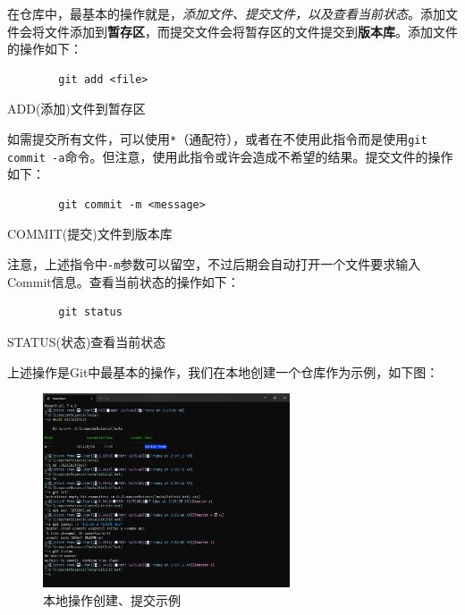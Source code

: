 在仓库中，最基本的操作就是，\textit{添加文件、提交文件，以及查看当前状态}。添加文件会将文件添加到\textbf{暂存区}，而提交文件会将暂存区的文件提交到\textbf{版本库}。添加文件的操作如下：

\begin{listing}[!htpb]
    \begin{verbatim}
        git add <file>
    \end{verbatim}
    \caption{ADD(添加)文件到暂存区}
\end{listing}

如需提交所有文件，可以使用\texttt{*}（通配符），或者在不使用此指令而是使用\texttt{git commit -a}命令。但注意，使用此指令或许会造成不希望的结果。提交文件的操作如下：

\begin{listing}[!htpb]
    \begin{verbatim}
        git commit -m <message>
    \end{verbatim}
    \caption{COMMIT(提交)文件到版本库}
\end{listing}

注意，上述指令中\texttt{-m}参数可以留空，不过后期会自动打开一个文件要求输入Commit信息。查看当前状态的操作如下：

\begin{listing}[!htpb]
    \begin{verbatim}
        git status
    \end{verbatim}
    \caption{STATUS(状态)查看当前状态}
\end{listing}

上述操作是Git中最基本的操作，我们在本地创建一个仓库作为示例，如下图：

\begin{figure}[!h]
    \centering
    \includegraphics[width=0.65\textwidth]{figures/git-local-operations.png}
    \caption{本地操作创建、提交示例}
    \label{fig:git-local-operations}
\end{figure}

